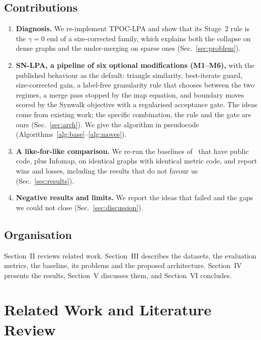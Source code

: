 \documentclass[conference]{IEEEtran}
\begin{document}
\subsection{Contributions}\label{sec:contrib}
\begin{enumerate}
\item \textbf{Diagnosis.} We re-implement TPOC-LPA and show that its Stage~2 rule is the $\gamma{=}0$ end of a size-corrected family, which explains both the collapse on dense graphs and the under-merging on sparse ones (Sec.~\ref{sec:problem}).
\item \textbf{SN-LPA, a pipeline of six optional modifications (M1--M6),} with the published behaviour as the default: triangle similarity, best-iterate guard, size-corrected gain, a label-free granularity rule that chooses between the two regimes, a merge pass stopped by the map equation, and boundary moves scored by the Synwalk objective with a regularised acceptance gate. The ideas come from existing work; the specific combination, the rule and the gate are ours (Sec.~\ref{sec:arch}). We give the algorithm in pseudocode (Algorithms~\ref{alg:base}--\ref{alg:moves}).
\item \textbf{A like-for-like comparison.} We re-run the baselines of~\cite{kong2026} that have public code, plus Infomap, on identical graphs with identical metric code, and report wins and losses, including the results that do not favour us (Sec.~\ref{sec:results}).
\item \textbf{Negative results and limits.} We report the ideas that failed and the gaps we could not close (Sec.~\ref{sec:discussion}).
\end{enumerate}

\subsection{Organisation}
Section~II reviews related work. Section~III describes the datasets, the evaluation metrics, the baseline, its problems and the proposed architecture. Section~IV presents the results, Section~V discusses them, and Section~VI concludes.

\section{Related Work and Literature Review}\label{sec:related}
\end{document}

